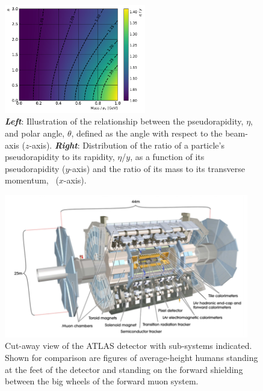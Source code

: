 \begin{figure}[!htb]
    \begin{center}
        \includegraphics[width=0.55\textwidth]{figures/chapter2/eta_vs_rap}
        \caption{
            \textbf{\textit{Left}}: Illustration of the relationship between the pseudorapidity, $\eta$,
                and polar angle, $\theta$, defined as the angle with respect to the beam-axis ($z$-axis).
            \textbf{\textit{Right}}: Distribution of the ratio of a particle's pseudorapidity to its rapidity, $\eta$/$y$,
                as a function of its pseudorapidity ($y$-axis) and the ratio of its mass to its transverse momentum, \pT~($x$-axis).
        }
        \label{fig:eta_desc}
    \end{center}
\end{figure}


\begin{figure}[!htb]
    \begin{center}
        \includegraphics[width=0.95\textwidth]{figures/chapter2/atlas_cutaway}
        \caption{
            Cut-away view of the ATLAS detector with sub-systems indicated.
            Shown for comparison are figures of average-height humans standing
            at the feet of the detector and standing on the forward shielding
            between the big wheels of the forward muon system.
        }
        \label{fig:atlas_cutaway}
    \end{center}
\end{figure}


